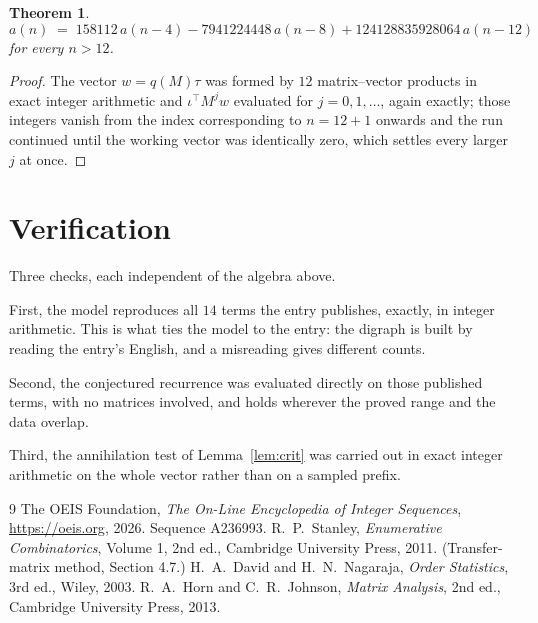 \documentclass[11pt,a4paper]{article}
\theoremstyle{plain}
\newtheorem{theorem}{Theorem}
\theoremstyle{definition}
\begin{document}
\begin{theorem}
\[
a(n)\;=\;158112\,a(n-4) - 7941224448\,a(n-8) + 124128835928064\,a(n-12)
\]
for every $n>12$.
\end{theorem}

\begin{proof}
The vector $w=q(M)\tau$ was formed by $12$ matrix--vector products in exact integer
arithmetic and $\iota^{\!\top}M^{j}w$ evaluated for $j=0,1,\dots$, again exactly; those
integers vanish from the index corresponding to $n=12+1$ onwards and the run continued
until the working vector was identically zero, which settles every larger $j$ at once.
\end{proof}

\section{Verification}

Three checks, each independent of the algebra above.

First, the model reproduces all $14$ terms the entry publishes, exactly, in integer
arithmetic. This is what ties the model to the entry: the digraph is built by reading the
entry's English, and a misreading gives different counts.

Second, the conjectured recurrence was evaluated directly on those published terms, with no
matrices involved, and holds wherever the proved range and the data overlap.

Third, the annihilation test of Lemma~\ref{lem:crit} was carried out in exact integer
arithmetic on the whole vector rather than on a sampled prefix.

\begin{thebibliography}{9}
 The OEIS Foundation, \emph{The On-Line Encyclopedia of Integer
Sequences}, \url{https://oeis.org}, 2026. Sequence A236993.
 R.~P.~Stanley, \emph{Enumerative Combinatorics}, Volume 1, 2nd ed.,
Cambridge University Press, 2011. (Transfer-matrix method, Section 4.7.)
 H.~A.~David and H.~N.~Nagaraja, \emph{Order Statistics}, 3rd ed., Wiley,
2003.
 R.~A.~Horn and C.~R.~Johnson, \emph{Matrix Analysis}, 2nd ed., Cambridge
University Press, 2013.
\end{thebibliography}
\end{document}
